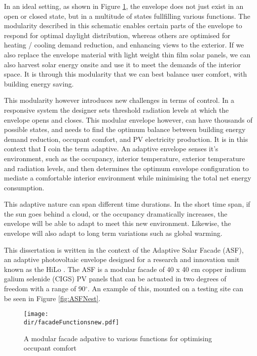 
In an ideal setting, as shown in Figure \ref{fig:facadefunctions}, the envelope does not just exist in an open or closed state, but in a multitude of states fullfilling various functions. The modularity described in this schematic enables certain parts of the envelope to respond for optimal daylight distribution, whereas others are optimised for heating / cooling demand reduction, and enhancing views to the exterior. If we also replace the envelope material with light weight thin film solar panels, we can also harvest solar energy onsite and use it to meet the demands of the interior space. It is through this modularity that we can best balance user comfort, with building energy saving.

This modularity however introduces new challenges in terms of control. In a responsive system the designer sets threshold radiation levels at which the envelope opens and closes. This modular envelope however, can have thousands of possible states, and needs to find the optimum balance between building energy demand reduction, occupant comfort, and PV electricity production. It is in this context that I coin the term adaptive. An adaptive envelope senses it's environment, such as the occupancy, interior temperature, exterior temperature and radiation levels, and then determines the optimum envelope configuration to mediate a comfortable interior environment while minimising the total net energy consumption. 

This adaptive nature can span different time durations. In the short time span, if the sun goes behind a cloud, or the occupancy dramatically increases, the envelope will be able to adapt to meet this new environment. Likewise, the envelope will also adapt to long term variations such as global warming. 

This dissertation is written in the context of the Adaptive Solar Facade (ASF), an adaptive photovoltaic envelope designed for a research and innovation unit known as the HiLo \cite{Block2017}. The ASF is a modular facade of 40 x 40 cm copper indium galium selenide (CIGS) PV panels that can be actuated in two degrees of freedom with a range of 90$^{\circ}$. An example of this, mounted on a testing site can be seen in Figure \ref{fig:ASFNest}.


\begin{figure}
\begin{center}
\texttt{[image: \\dir/facadeFunctionsnew.pdf]}
\caption{A modular facade adpative to various functions for optimising occupant comfort}
\label{fig:facadefunctions}
\end{center}
\end{figure}

